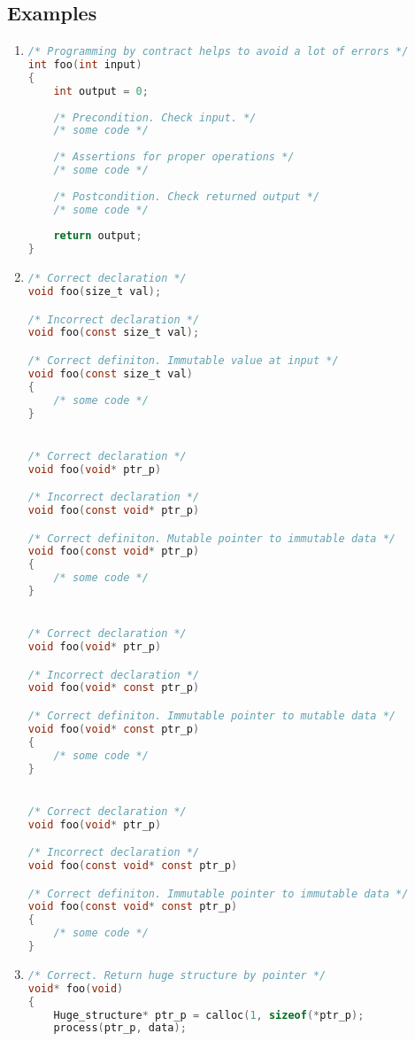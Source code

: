 \subsection{Examples}
\begin{enumerate}
    \item 
\begin{lstlisting}[language=C,style=C99]
/* Programming by contract helps to avoid a lot of errors */
int foo(int input)
{
    int output = 0;
    
    /* Precondition. Check input. */
    /* some code */
    
    /* Assertions for proper operations */
    /* some code */
    
    /* Postcondition. Check returned output */
    /* some code */
    
    return output;
}
\end{lstlisting}

    \item 
\begin{lstlisting}[language=C,style=C99]
/* Correct declaration */
void foo(size_t val);

/* Incorrect declaration */
void foo(const size_t val);

/* Correct definiton. Immutable value at input */
void foo(const size_t val)
{
    /* some code */
}


/* Correct declaration */
void foo(void* ptr_p)

/* Incorrect declaration */
void foo(const void* ptr_p)

/* Correct definiton. Mutable pointer to immutable data */
void foo(const void* ptr_p)
{
    /* some code */
}


/* Correct declaration */
void foo(void* ptr_p)

/* Incorrect declaration */
void foo(void* const ptr_p)

/* Correct definiton. Immutable pointer to mutable data */
void foo(void* const ptr_p)
{
    /* some code */
}


/* Correct declaration */
void foo(void* ptr_p)

/* Incorrect declaration */
void foo(const void* const ptr_p)

/* Correct definiton. Immutable pointer to immutable data */
void foo(const void* const ptr_p)
{
    /* some code */
}
\end{lstlisting}

    \item 
\begin{lstlisting}[language=C,style=C99]
/* Correct. Return huge structure by pointer */
void* foo(void)
{
    Huge_structure* ptr_p = calloc(1, sizeof(*ptr_p);
    process(ptr_p, data);
    

\end{lstlisting}
\end{enumerate}
